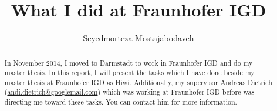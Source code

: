 \documentclass[]{report}
\title{What I did at Fraunhofer IGD}
\author{Seyedmorteza Mostajabodaveh}
\begin{document}
\maketitle

\begin{abstract}
In November 2014, I moved to Darmstadt to work in Fraunhofer IGD and do my master thesis. In this report, I will present the tasks which I have done beside my master thesis at Fraunhofer IGD as Hiwi. Additionally, my supervisor Andreas Dietrich (\href{andi.dietrich@googlemail.com}{andi.dietrich@googlemail.com}) which was working at Fraunhofer IGD before was directing me toward these tasks. You can contact him for more information.

\end{abstract}

\begin{figure}[!ht]
	\hfill
	\hfill
	\hfill
	\hfill
\end{figure}
\end{document}
